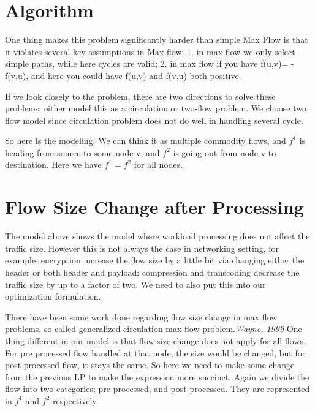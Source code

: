 \documentclass[twoside,leqno, 11pt]{article}
\begin{document}
\section{Algorithm}
One thing makes this problem significantly harder than simple Max Flow is that it violates several key assumptions in Max flow: 1. in max flow we only select simple paths, while here cycles are valid; 2. in max flow if you have f(u,v)= -f(v,u), and here you could have f(u,v) and f(v,u) both positive. 

If we look closely to the problem, there are two directions to solve these problems: either model this as a circulation or two-flow problem. We choose two flow model since circulation problem does not do well in handling several cycle. 

So here is the modeling:\newline
 We can think it as multiple commodity flows, and $f^1$ is heading from source to some node v, and $f^2$ is going out from node v to destination. Here we have $f^1=f^2$ for all nodes.  





\section{Flow Size Change after Processing}
The model above shows the model where workload processing does not affect the traffic size. However this is not always the case in networking setting, for example, encryption increase the flow size by a little bit via changing either the header or both header and payload\cite{SIMPLE2013}; compression and transcoding decrease the traffic size by up to a factor of two\cite{Mogul1997}. We need to also put this into our optimization formulation.

There have been some work done regarding flow size change in max flow problems, so called generalized circulation max flow problem.\emph{Wayne, 1999}\cite{Wayne1999}  One thing different in our model is that flow size change does not apply for all flows. For pre processed flow handled at that node, the size would be changed, but for post processed flow, it stays the same. So here we need to make some change from the previous LP to make the expression more succinct. 
Again we divide the flow into two categories; pre-processed, and post-processed. They are represented in $f^1$ and $f^2$ respectively. 
\end{document}
